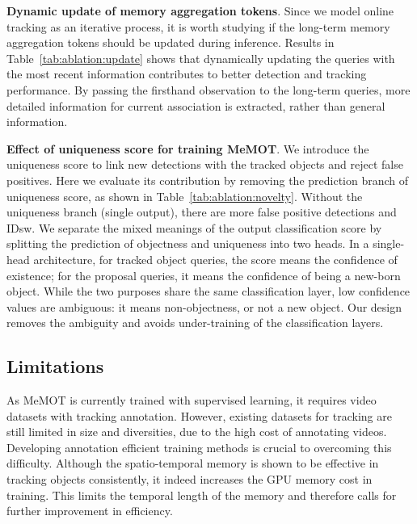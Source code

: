 \vspace{3pt} \noindent \textbf{Dynamic update of memory aggregation tokens}.
Since we model online tracking as an iterative process, it is worth studying if the long-term memory aggregation tokens should be updated during inference.
Results in Table~\ref{tab:ablation:update} shows that dynamically updating the queries with the most recent information contributes to better detection and tracking performance. By passing the firsthand observation to the long-term queries, more detailed information for current association is extracted, rather than general information.

\vspace{3pt} \noindent \textbf{Effect of uniqueness score for training MeMOT}.
We introduce the uniqueness score to link new detections with the tracked objects and reject false positives.
Here we evaluate its contribution by removing the prediction branch of uniqueness score, as shown in Table~\ref{tab:ablation:novelty}.
Without the uniqueness branch (single output), there are more false positive detections and IDsw.
We separate the mixed meanings of the output classification score by splitting the prediction of objectness and uniqueness into two heads. In a single-head architecture, for tracked object queries, the score means the confidence of existence; for the proposal queries, it means the confidence of being a new-born object. While the two purposes share the same classification layer, low confidence values are ambiguous: it means non-objectness, or not a new object. Our design removes the ambiguity and avoids under-training of the classification layers.

\subsection{Limitations}
\label{sec:exp:limitations}

As MeMOT is currently trained with supervised learning, it requires video datasets with tracking annotation. 
However, existing datasets for tracking are still limited in size and diversities, due to the high cost of annotating videos. 
Developing annotation efficient training methods is crucial to overcoming this difficulty.
Although the spatio-temporal memory is shown to be effective in tracking objects consistently, it indeed increases the GPU memory cost in training. This limits the temporal length of the memory and therefore calls for further improvement in efficiency.
